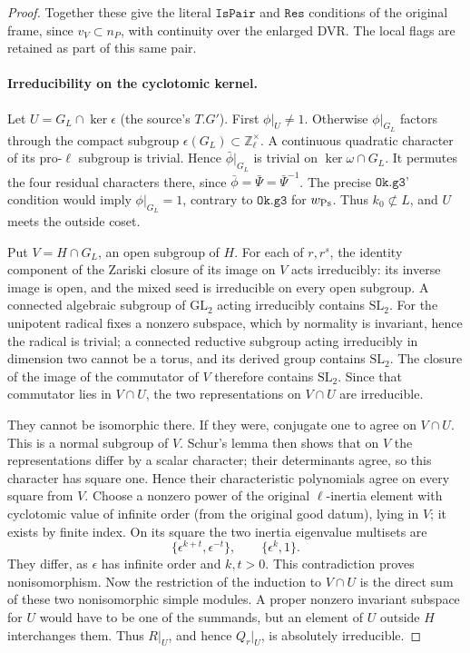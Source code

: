 \begin{proof}
Together these give the literal \(\texttt{IsPair}\) and
\(\texttt{Res}\) conditions of the original frame, since
\(v_V\subset n_P\), with continuity over the enlarged DVR.
The local flags are retained as part of this same pair.

\paragraph{Irreducibility on the cyclotomic kernel.}
Let \(U=G_L\cap\ker\epsilon\) (the source's \(T.G'\)).
First \(\phi|_U\ne1\). Otherwise \(\phi|_{G_L}\) factors through
the compact subgroup \(\epsilon(G_L)\subset\mathbb Z_\ell^\times\).
A continuous quadratic character of its pro-\(\ell\) subgroup
is trivial. Hence \(\bar\phi|_{G_L}\) is trivial on
\(\ker\omega\cap G_L\). It permutes the four residual characters
there, since \(\bar\phi=\bar\Psi=\bar\Psi^{-1}\). The precise
\(\texttt{Ok.g3'}\) condition would imply \(\phi|_{G_L}=1\),
contrary to \(\texttt{Ok.g3}\) for \(w_{\rm Ps}\).
Thus \(k_0\not\subset L\), and \(U\) meets the outside coset.

Put \(V=H\cap G_L\), an open subgroup of \(H\).
For each of \(r,r^s\), the identity component of the Zariski
closure of its image on \(V\) acts irreducibly: its inverse image
is open, and the mixed seed is irreducible on every open
subgroup. A connected algebraic subgroup of
\(\mathrm{GL}_2\) acting irreducibly contains \(\mathrm{SL}_2\).
For the unipotent radical fixes a nonzero subspace, which by
normality is invariant, hence the radical is trivial; a
connected reductive subgroup acting irreducibly in dimension two
cannot be a torus, and its derived group contains
\(\mathrm{SL}_2\). The closure of the image of the commutator
of \(V\) therefore contains \(\mathrm{SL}_2\). Since that
commutator lies in \(V\cap U\), the two representations on
\(V\cap U\) are irreducible.

They cannot be isomorphic there. If they were, conjugate one
to agree on \(V\cap U\). This is a normal subgroup of \(V\).
Schur's lemma then shows that on \(V\) the representations
differ by a scalar character; their determinants agree,
so this character has square one. Hence their characteristic
polynomials agree on every square from \(V\).
Choose a nonzero power of the original \(\ell\)-inertia element
with cyclotomic value of infinite order (from the original
good datum), lying in \(V\); it exists by finite index.
On its square the two inertia eigenvalue multisets are
\[
 \{\epsilon^{k+t},\epsilon^{-t}\},\qquad
 \{\epsilon^k,1\}.
\]
They differ, as \(\epsilon\) has infinite order and \(k,t>0\).
This contradiction proves nonisomorphism. Now the restriction
of the induction to \(V\cap U\) is the direct sum of these two
nonisomorphic simple modules. A proper nonzero invariant
subspace for \(U\) would have to be one of the summands,
but an element of \(U\) outside \(H\) interchanges them.
Thus \(R|_U\), and hence \(Q_r|_U\), is absolutely irreducible.


\end{proof}
